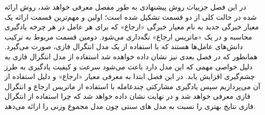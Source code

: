 در این فصل جزییات روش پیشنهادی به طور مفصل معرفی خواهد شد، روش ارائه شده در حالت کلی از دو قسمت تشکیل شده است؛ اولین و مهم‌ترین قسمت ارائه یک معیار خبرگی جدید به نام معیار خبرگی «ارجاع» که برای هر عامل در هر چرخه یادگیری محاسبه و در یک «ماتریس ارجاع» نگه‌داری می‌شود. دومین قسمت مربوط به ترکیب دانش‌های عامل‌ها هستند که با استفاده از یک مدل انتگرال فازی، صورت می‌گیرد. همانطور که در فصل بعدی نیز نشان داده خواهده شد استفاده از مدل انتگرال فازی به دلیل خواصی مهمی که این مدل دارد باعث می‌شود سرعت و کیفیت یادگیری به طرز چشم‌گیری افزایش یابد. در این فصل ابتدا به معرفی معیار «ارجاع» و دلیل استفاده از آن می‌پردازیم سپس یادگیری مشارکتی چندعامله با استفاده از ماتریس ارجاع و انتگرال فازی معرفی خواهد شد و در نهایت نشان داده خواهد شد که چرا استفاده از انتگرال فازی نتایج بهتری را نسبت به مدل های سنتی چون مدل مجموع وزنی را ارائه می‌دهد.